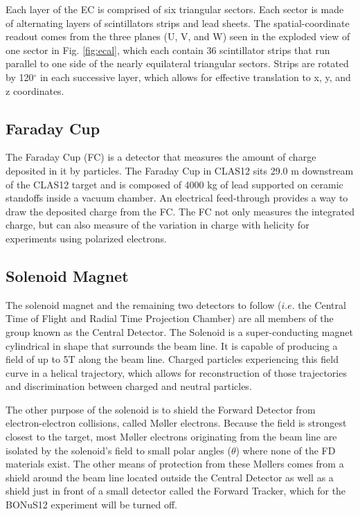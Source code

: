 Each layer of the EC is comprised of six triangular sectors. Each sector is made of alternating layers of scintillators strips and lead sheets. The spatial-coordinate readout comes from the three planes (U, V, and W) seen in the exploded view of one sector in Fig. \ref{fig:ecal}, which each contain 36 scintillator strips that run parallel to one side of the nearly equilateral triangular sectors. Strips are rotated by 120$^{\circ}$ in each successive layer, which allows for effective translation to x, y, and z coordinates.\cite{clas12:EC}

\newpage
\subsection{Faraday Cup}
\label{sec:fc}
The Faraday Cup (FC) is a detector that measures the amount of charge deposited in it by particles. The Faraday Cup in CLAS12 sits 29.0 m downstream of the CLAS12 target and is composed of 4000 kg of lead supported on ceramic standoffs inside a vacuum chamber.\cite{CLAS12} An electrical feed-through provides a way to draw the deposited charge from the FC. The FC not only measures the integrated charge, but can also measure of the variation in charge with helicity for experiments using polarized electrons.

\subsection{Solenoid Magnet}
The solenoid magnet and the remaining two detectors to follow ($i.e.$ the Central Time of Flight and Radial Time Projection Chamber) are all members of the group known as the Central Detector. The Solenoid is a super-conducting magnet cylindrical in shape that surrounds the beam line. It is capable of producing a field of up to 5T along the beam line.\cite{clas12:mags} Charged particles experiencing this field curve in a helical trajectory, which allows for reconstruction of those trajectories and discrimination between charged and neutral particles.

The other purpose of the solenoid is to shield the Forward Detector from electron-electron collisions, called M\o ller electrons. Because the field is strongest closest to the target, most M\o ller electrons originating from the beam line are isolated by the solenoid's field to small polar angles ($\theta$) where none of the FD materials exist. The other means of protection from these M\o llers comes from a shield around the beam line located outside the Central Detector as well as a shield just in front of a small detector called the Forward Tracker, which for the BONuS12 experiment will be turned off.

